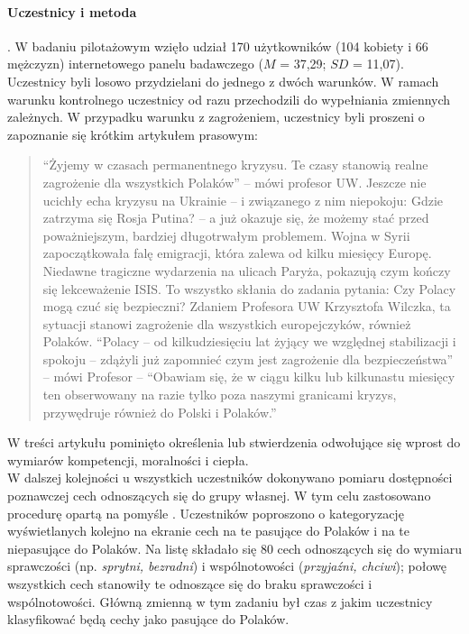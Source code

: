 \documentclass[man]{apa6}
\begin{document}
\paragraph{Uczestnicy i metoda}.
W badaniu pilotażowym wzięło udział 170 użytkowników (104 kobiety i 66 mężczyzn) internetowego panelu badawczego ($M$ = 37,29; $SD$ = 11,07).\\

Uczestnicy byli losowo przydzielani do jednego z dwóch warunków. W ramach warunku kontrolnego uczestnicy od razu przechodzili do wypełniania zmiennych zależnych. W przypadku warunku z zagrożeniem, uczestnicy byli proszeni o zapoznanie się krótkim artykułem prasowym:
\blockquote{``Żyjemy w czasach permanentnego kryzysu. Te czasy stanowią realne zagrożenie dla wszystkich Polaków'' -- mówi profesor UW. Jeszcze nie ucichły echa kryzysu na Ukrainie -- i związanego z nim niepokoju: Gdzie zatrzyma się Rosja Putina? -- a już okazuje się, że możemy stać przed poważniejszym, bardziej długotrwałym problemem. Wojna w Syrii zapoczątkowała falę emigracji, która zalewa od kilku miesięcy Europę. Niedawne tragiczne wydarzenia na ulicach Paryża, pokazują czym kończy się lekceważenie ISIS. To wszystko skłania do zadania pytania: Czy Polacy mogą czuć się bezpieczni? Zdaniem Profesora UW Krzysztofa Wilczka, ta sytuacji stanowi zagrożenie dla wszystkich europejczyków, również Polaków. ``Polacy -- od kilkudziesięciu lat żyjący we względnej stabilizacji i spokoju -- zdążyli już zapomnieć czym jest zagrożenie dla bezpieczeństwa'' -- mówi Profesor -- ``Obawiam się, że w ciągu kilku lub kilkunastu miesięcy ten obserwowany na razie tylko poza naszymi granicami kryzys, przywędruje również do Polski i Polaków.''}

W treści artykułu pominięto określenia lub stwierdzenia odwołujące się wprost do wymiarów kompetencji, moralności i ciepła.\\

W dalszej kolejności u wszystkich uczestników dokonywano pomiaru dostępności poznawczej cech odnoszących się do grupy własnej. W tym celu zastosowano procedurę opartą na pomyśle \textcite{dodgson1998self}. Uczestników poproszono o kategoryzację wyświetlanych kolejno na ekranie cech na te pasujące do Polaków i na te niepasujące do Polaków. Na listę składało się 80 cech odnoszących się do wymiaru sprawczości (np. \emph{sprytni, bezradni}) i wspólnotowości (\emph{przyjaźni, chciwi}); połowę wszystkich cech stanowiły te odnoszące się do braku sprawczości i wspólnotowości. Główną zmienną w tym zadaniu był czas z jakim uczestnicy klasyfikować będą cechy jako pasujące do Polaków.
\end{document}
